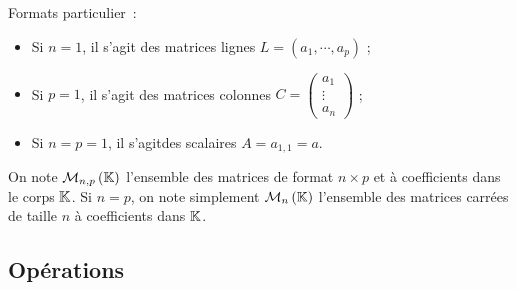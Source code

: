 Formats particulier~:
\begin{itemize}
	\item Si $n=1$, il s'agit des matrices lignes $L = (a_1, \cdots, a_p)$ ;
	\item Si $p=1$, il s'agit des matrices colonnes $C = \begin{pmatrix} a_1 \\ \vdots \\ a_n \end{pmatrix}$ ;
	\item Si $n=p=1$, il s'agitdes scalaires $A=a_{1,1}=a$.
\end{itemize}

On note $\mathcal{M}_{n,p}\left(\mathbb{K}\right)$ l'ensemble des matrices de format $n \times p$ et à coefficients dans le corps $\mathbb{K}$. Si $n=p$, on note simplement $\mathcal{M}_{n}\left(\mathbb{K}\right)$ l'ensemble des matrices carrées de taille $n$ à coefficients dans $\mathbb{K}$.

\subsection{Opérations}
